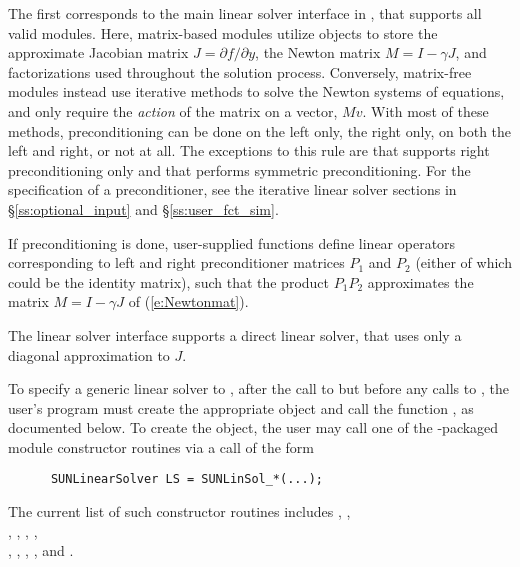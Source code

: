 The first corresponds to the main linear solver interface in {\cvodes},
that supports all valid {\sunlinsol} modules.  Here, matrix-based
{\sunlinsol} modules utilize {\sunmatrix} objects to store the
approximate Jacobian matrix $J = \partial{f}/\partial{y}$, the Newton
matrix $M = I-\gamma J$, and factorizations used throughout the
solution process.  Conversely, matrix-free {\sunlinsol} modules
instead use iterative methods to solve the Newton systems of
equations, and only require the \emph{action} of the matrix on a
vector, $Mv$.  With most of these methods, preconditioning can be done
on the left only, the right only, on both the left and right, or not
at all.  The exceptions to this rule are {\spfgmr} that supports right
preconditioning only and {\pcg} that performs symmetric
preconditioning.  For the specification of a preconditioner, see the
iterative linear solver sections in \S\ref{ss:optional_input} and
\S\ref{ss:user_fct_sim}.

If preconditioning is done, user-supplied functions define linear
operators corresponding to left and right preconditioner matrices
$P_1$ and $P_2$ (either of which could be the identity matrix), such
that the product $P_1 P_2$ approximates the matrix $M = I - \gamma J$
of (\ref{e:Newtonmat}).

The {\cvdiag} linear solver interface supports a direct linear solver,
that uses only a diagonal approximation to $J$.

To specify a generic linear solver to {\cvodes}, after the call to
 but before any calls to , the user's
program must create the appropriate  object and call
the function , as documented below.
To create the  object, the user may call one of
the {\sundials}-packaged {\sunlinsol} module constructor routines via
a call of the form

\begin{verbatim}
      SUNLinearSolver LS = SUNLinSol_*(...);
\end{verbatim}

The current list of such constructor routines includes
,
, \\ \noindent
{},
,
,
, \\ \noindent
{},
,
,
, and
.

